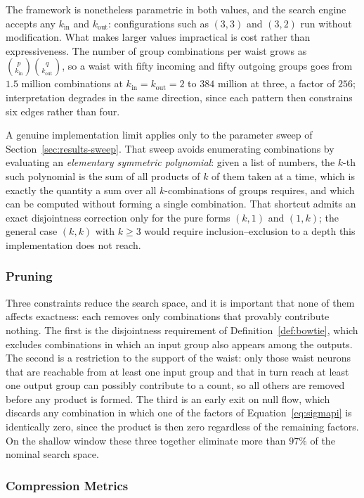 \documentclass[12pt,a4paper,oneside]{article}
\theoremstyle{definition}
\theoremstyle{plain}
\newcommand{\kin}{k_{\mathrm{in}}}
\newcommand{\kout}{k_{\mathrm{out}}}
\begin{document}
The framework is nonetheless parametric in both values, and the search engine
accepts any $\kin$ and $\kout$: configurations such as $(3,3)$ and $(3,2)$
run without modification. What makes larger values impractical is cost rather
than expressiveness. The number of group combinations per waist grows as
$\binom{p}{\kin}\binom{q}{\kout}$, so a waist with fifty incoming and fifty
outgoing groups goes from $1.5$ million combinations at $\kin=\kout=2$ to
$384$ million at three, a factor of $256$; interpretation degrades in the
same direction, since each pattern then constrains six edges rather than
four.

A genuine implementation limit applies only to the parameter sweep of
Section~\ref{sec:results-sweep}. That sweep avoids enumerating combinations
by evaluating an \emph{elementary symmetric polynomial}: given a list of
numbers, the $k$-th such polynomial is the sum of all products of $k$ of
them taken at a time, which is exactly the quantity a sum over all
$k$-combinations of groups requires, and which can be computed without
forming a single combination. That shortcut admits an exact
disjointness correction only for the pure forms $(k,1)$ and $(1,k)$; the
general case $(k,k)$ with $k \ge 3$ would require inclusion--exclusion to a
depth this implementation does not reach.

\subsubsection{Pruning}
\label{sec:pruning}

Three constraints reduce the search space, and it is important that none of
them affects exactness: each removes only combinations that provably
contribute nothing. The first is the disjointness requirement of
Definition~\ref{def:bowtie}, which excludes combinations in which an input
group also appears among the outputs. The second is a restriction to the
support of the waist: only those waist neurons that are reachable from at
least one input group and that in turn reach at least one output group can
possibly contribute to a count, so all others are removed before any product
is formed. The third is an early exit on null flow, which discards any
combination in which one of the factors of Equation~\eqref{eq:sigmapi} is
identically zero, since the product is then zero regardless of the remaining
factors. On the shallow window these three together eliminate more than
$97\%$ of the nominal search space.

\subsubsection{Compression Metrics}
\label{sec:compression-methods}
\end{document}
